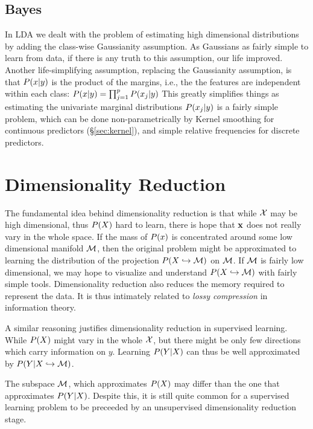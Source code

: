 \subsection{\Naive Bayes}
\label{sec:naive_bayes}
In LDA we dealt with the problem of estimating high dimensional distributions by adding the class-wise Gaussianity assumption. As Gaussians as fairly simple to learn from data, if there is any truth to this assumption, our life improved. 
Another life-simplifying assumption, replacing the Gaussianity assumption, is that $P(x|y)$ is the product of the margins, i.e., the the features are independent within each class: $P(x|y)=\prod_{j=1}^pP(x_j|y)$
This greatly simplifies things as estimating the univariate marginal distributions $P(x_j|y)$ is a fairly simple problem, which can be done non-parametrically by Kernel smoothing for continuous predictors (\S\ref{sec:kernel}), and simple relative frequencies for discrete predictors. 



\section{Dimensionality Reduction}
\label{sec:dim_reduce}
The fundamental idea behind dimensionality reduction is that while $\mathcal{X}$ may be high dimensional, thus $P(X)$ hard to learn, there is hope that $\mathbf{x}$ does not really vary in the whole space. 
If the mass of $P(x)$ is concentrated around some low dimensional manifold $\mathcal{M}$, then the original problem might be approximated to learning the distribution of the projection $P(X \hookrightarrow \mathcal{M})$ on $\mathcal{M}$. 
If $\mathcal{M}$ is fairly low dimensional, we may hope to visualize and understand $P(X \hookrightarrow \mathcal{M})$ with fairly simple tools.
Dimensionality reduction also reduces the memory required to represent the data. It is thus intimately related to \emph{lossy compression} in information theory.

A similar reasoning justifies dimensionality reduction in supervised learning. While $P(X)$ might vary in the whole $\mathcal{X}$, but there might be only few directions which carry information on $y$. Learning $P(Y|X)$ can thus be well approximated by $P(Y|X \hookrightarrow \mathcal{M})$.


\begin{remark}
The subspace $\mathcal{M}$, which approximates $P(X)$ may differ than the one that approximates $P(Y|X)$. Despite this, it is still quite common for a supervised learning problem to be preceeded by an unsupervised dimensionality reduction stage.
\end{remark}



